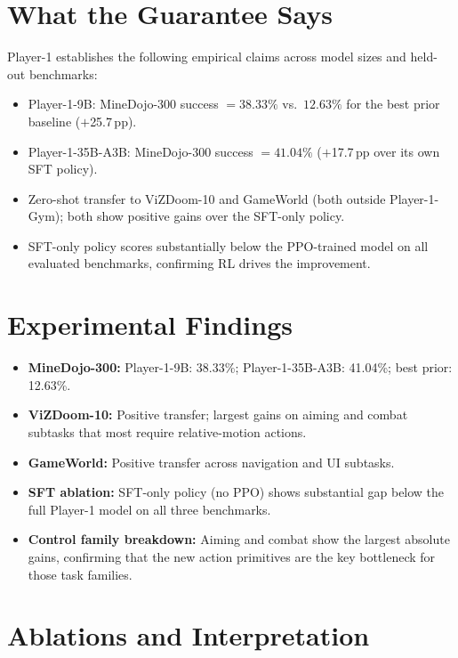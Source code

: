 \documentclass[10pt,twocolumn]{article}
\begin{document}
\section{What the Guarantee Says}

Player-1 establishes the following empirical claims across model sizes and
held-out benchmarks:

\begin{itemize}[itemsep=2pt,parsep=0pt]
  \item Player-1-9B: MineDojo-300 success $= 38.33\%$
    vs.\ $12.63\%$ for the best prior baseline ($+$25.7\,pp).
  \item Player-1-35B-A3B: MineDojo-300 success $= 41.04\%$
    ($+$17.7\,pp over its own SFT policy).
  \item Zero-shot transfer to ViZDoom-10 and GameWorld (both outside
    Player-1-Gym); both show positive gains over the SFT-only policy.
  \item SFT-only policy scores substantially below the PPO-trained model on all
    evaluated benchmarks, confirming RL drives the improvement.
\end{itemize}

\section{Experimental Findings}

\begin{itemize}[itemsep=2pt,parsep=0pt]
  \item \textbf{MineDojo-300:} Player-1-9B: 38.33\%;
    Player-1-35B-A3B: 41.04\%; best prior: 12.63\%.
  \item \textbf{ViZDoom-10:} Positive transfer; largest gains on aiming and
    combat subtasks that most require relative-motion actions.
  \item \textbf{GameWorld:} Positive transfer across navigation and UI subtasks.
  \item \textbf{SFT ablation:} SFT-only policy (no PPO) shows substantial gap
    below the full Player-1 model on all three benchmarks.
  \item \textbf{Control family breakdown:} Aiming and combat show the largest
    absolute gains, confirming that the new action primitives are the key
    bottleneck for those task families.
\end{itemize}

\section{Ablations and Interpretation}
\end{document}
